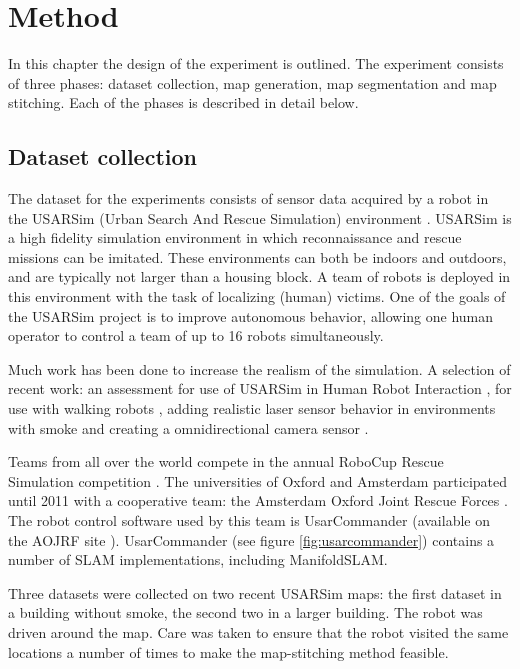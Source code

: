 \chapter{Method}
\label{method}

In this chapter the design of the experiment is outlined. The experiment consists of three phases: dataset collection, map generation, map segmentation and map stitching. Each of the phases is described in detail below.

\section{Dataset collection}
The dataset for the experiments consists of sensor data acquired by a robot in the USARSim (Urban Search And Rescue Simulation) environment \cite{balaguer2008usarsim, usarsimsite}. USARSim is a high fidelity simulation environment in which reconnaissance and rescue missions can be imitated. These environments can both be indoors and outdoors, and are typically not larger than a housing block. A team of robots is deployed in this environment with the task of localizing (human) victims. One of the goals of the USARSim project is to improve autonomous behavior, allowing one human operator to control a team of up to 16 robots simultaneously.

Much work has been done to increase the realism of the simulation. A selection of recent work: an assessment for use of USARSim in Human Robot Interaction \cite{wang2005validating}, for use with walking robots \cite{van2012validation}, adding realistic laser sensor behavior in environments with smoke \cite{formsma2011realistic} and creating a omnidirectional camera sensor \cite{schmits2009omnidirectional}.

Teams from all over the world compete in the annual RoboCup Rescue Simulation competition \cite{robocupsite}. The universities of Oxford and Amsterdam participated until 2011 with a cooperative team: the Amsterdam Oxford Joint Rescue Forces \cite{aojrf2011, visser2012uva}. The robot control software used by this team is UsarCommander (available on the AOJRF site \cite{jrfsite}). UsarCommander (see figure \ref{fig:usarcommander}) contains a number of SLAM implementations, including ManifoldSLAM.

Three datasets were collected on two recent USARSim maps: the first dataset in a building without smoke, the second two in a larger building. The robot was driven around the map. Care was taken to ensure that the robot visited the same locations a number of times to make the map-stitching method feasible.

